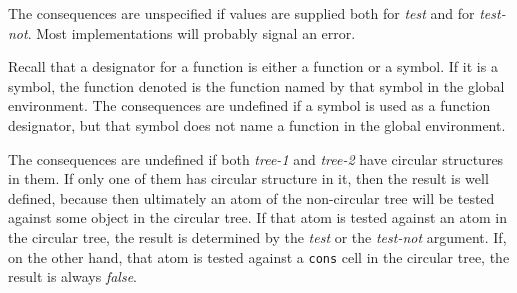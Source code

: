 The consequences are unspecified if values are supplied both for
\textit{test} and for \textit{test-not}.  Most implementations will
probably signal an error.

Recall that a designator for a function is either a function or a
symbol.  If it is a symbol, the function denoted is the function named
by that symbol in the global environment.  The consequences are
undefined if a symbol is used as a function designator, but that
symbol does not name a function in the global environment.

The consequences are undefined if both \textit{tree-1} and
\textit{tree-2} have circular structures in them.  If only one of them
has circular structure in it, then the result is well defined, because
then ultimately an atom of the non-circular tree will be tested
against some object in the circular tree.  If that atom is tested
against an atom in the circular tree, the result is determined by the
\textit{test} or the \textit{test-not} argument.  If, on the other
hand, that atom is tested against a \texttt{cons} cell in the circular
tree, the result is always \emph{false}.
